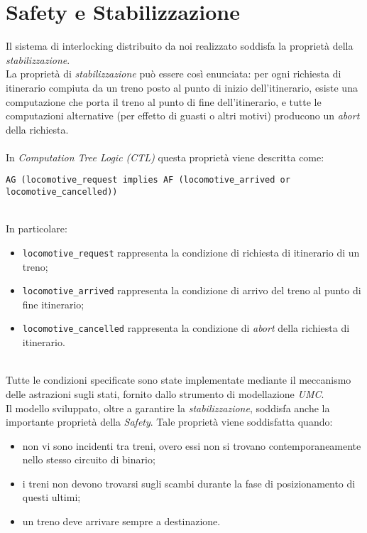 \documentclass[10pt,a4paper,oneside]{report}
\begin{document}
\chapter{Safety e Stabilizzazione}
Il sistema di interlocking distribuito da noi realizzato soddisfa la proprietà della \emph{stabilizzazione}.\\
La proprietà di \emph{stabilizzazione} può essere così enunciata:
per ogni richiesta di itinerario compiuta da un treno posto al punto di inizio dell’itinerario, esiste una computazione che porta il treno al punto di fine dell’itinerario, e tutte le computazioni alternative (per effetto di guasti o altri motivi) producono un \emph{abort} della richiesta.\\
\\
In \emph{Computation Tree Logic (CTL)} questa proprietà viene descritta come:\\
\begin{lstlisting}
AG (locomotive_request implies AF (locomotive_arrived or locomotive_cancelled)) 
\end{lstlisting} 
\\
In particolare:
\begin{itemize}
\item \verb!locomotive_request! rappresenta la condizione di richiesta di itinerario di un treno; 
\item \verb!locomotive_arrived! rappresenta la condizione di arrivo del treno al punto di fine itinerario;
\item \verb!locomotive_cancelled! rappresenta la condizione di \emph{abort} della richiesta di itinerario.
\end{itemize} 
\\
Tutte le condizioni specificate sono state implementate mediante il meccanismo delle astrazioni sugli stati, fornito dallo strumento di modellazione \emph{UMC}.\\
Il modello sviluppato, oltre a garantire la \emph{stabilizzazione}, soddisfa anche la importante proprietà della \emph{Safety}. Tale proprietà viene soddisfatta quando:
\begin{itemize}
\item non vi sono incidenti tra treni, overo essi non si trovano contemporaneamente nello stesso circuito di binario;
\item i treni non devono trovarsi sugli scambi durante la fase di posizionamento di questi ultimi; 
\item un treno deve arrivare sempre a destinazione.
\end{itemize}
\end{document}

